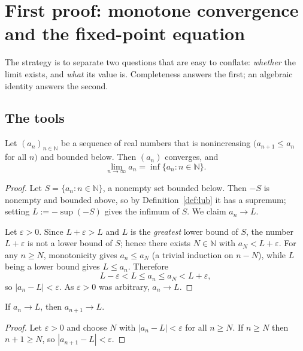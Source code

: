 \documentclass{essay}
\begin{document}
\section{First proof: monotone convergence and the fixed-point equation}

The strategy is to separate two questions that are easy to conflate: \emph{whether}
the limit exists, and \emph{what} its value is. Completeness answers the first;
an algebraic identity answers the second.

\subsection{The tools}

\begin{lemma}\label{lem:mct}
  Let \((a_{n})_{n \in \mathbb{N}}\) be a sequence of real numbers that is nonincreasing
  \((a_{n+1} \leq a_{n}\) for all \(n)\) and bounded below. Then \((a_{n})\) converges, and
  \[ \lim_{n \to \infty} a_{n} = \inf \{ a_{n} : n \in \mathbb{N} \}. \]
\end{lemma}

\begin{proof}
  Let \(S = \{a_{n} : n \in \mathbb{N}\}\), a nonempty set bounded below. Then \(-S\) is
  nonempty and bounded above, so by Definition~\ref{def:lub} it has a supremum;
  setting \(L := -\sup(-S)\) gives the infimum of \(S\). We claim \(a_{n} \to L\).

  Let \(\varepsilon > 0\). Since \(L + \varepsilon > L\) and \(L\) is the \emph{greatest}
  lower bound of \(S\), the number \(L + \varepsilon\) is not a lower bound of \(S\); hence
  there exists \(N \in \mathbb{N}\) with \(a_{N} < L + \varepsilon\). For any \(n \geq N\),
  monotonicity gives \(a_{n} \leq a_{N}\) (a trivial induction on \(n - N\)), while \(L\)
  being a lower bound gives \(L \leq a_{n}\). Therefore
  \[ L - \varepsilon < L \leq a_{n} \leq a_{N} < L + \varepsilon, \]
  so \(|a_{n} - L| < \varepsilon\). As \(\varepsilon > 0\) was arbitrary, \(a_{n} \to L\).
\end{proof}

\begin{lemma}\label{lem:shift}
  If \(a_{n} \to L\), then \(a_{n+1} \to L\).
\end{lemma}

\begin{proof}
  Let \(\varepsilon > 0\) and choose \(N\) with \(|a_{n} - L| < \varepsilon\) for all
  \(n \geq N\). If \(n \geq N\) then \(n + 1 \geq N\), so \(|a_{n+1} - L| < \varepsilon\).
\end{proof}
\end{document}
